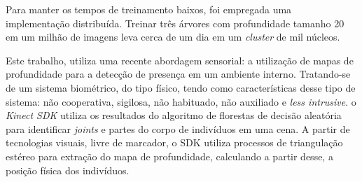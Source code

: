 Para manter os tempos de treinamento baixos, foi empregada uma implementação distribuída. Treinar três árvores com profundidade tamanho 20 em um milhão de imagens leva cerca de um dia em um \textit{cluster} de mil núcleos.

Este trabalho, utiliza uma recente abordagem sensorial: a utilização de mapas de profundidade para a detecção de presença em um ambiente interno. Tratando-se de um sistema biométrico, do tipo físico, tendo como características desse tipo de sistema: não cooperativa, sigilosa, não habituado, não auxiliado e \textit{less intrusive}. o \textit{Kinect SDK} utiliza os resultados do algoritmo de florestas de decisão aleatória para identificar \textit{joints} e partes do corpo de indivíduos em uma cena. A partir de tecnologias visuais, livre de marcador, o SDK utiliza processos de triangulação estéreo para extração do mapa de profundidade, calculando a partir desse, a posição física dos indivíduos.